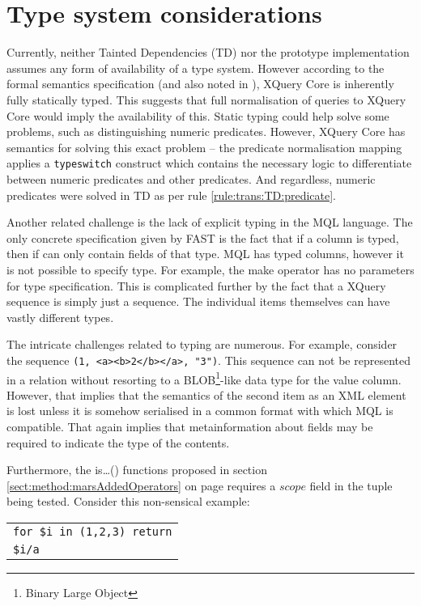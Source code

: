 \section{Type system considerations}
\label{sect:disc:typeSystem}
Currently, neither Tainted Dependencies (TD) nor the prototype
implementation assumes any form of availability of a type system. However
according to the formal semantics specification\cite{xquery_semantics} (and
also noted in \cite{pathfinder_compiling_xquery}), XQuery Core is inherently
fully statically typed. This suggests that full normalisation of queries to
XQuery Core would imply the availability of this. Static typing could help
solve some problems, such as distinguishing numeric predicates. However, XQuery
Core has semantics for solving this exact problem -- the predicate normalisation
mapping applies a \texttt{typeswitch} construct which contains the necessary logic to
differentiate between numeric predicates and other predicates. And regardless,
numeric predicates were solved in TD as per rule \ref{rule:trans:TD:predicate}.

Another related challenge is the lack of explicit typing in the MQL language.
The only concrete specification given by FAST is the fact that if a column is
typed, then if can only contain fields of that type. MQL has typed columns,
however it is not possible to specify type. For example, the \textsf{make}
operator has no parameters for type specification. This is complicated further
by the fact that a XQuery sequence is simply just a sequence. The individual
items themselves can have vastly different types.

The intricate challenges related to typing are numerous. For example, consider
the sequence \texttt{(1, <a><b>2</b></a>, "3")}. This sequence can not be
represented in a relation without resorting to a BLOB\footnote{Binary
Large Object}-like data type for the value column. However, that implies that
the semantics of the second item as an XML element is lost unless it is somehow
serialised in a common format with which MQL is compatible. That again implies
that metainformation about fields may be required to indicate the type of the
contents.

Furthermore, the \textsf{is\ldots{()}} functions proposed in section
\ref{sect:method:marsAddedOperators} on page
\pageref{sect:method:marsAddedOperators} requires a $scope$ field in the tuple
being tested. Consider this non-sensical example:

\begin{center}
\begin{tabular}{l}
\texttt{for \$i in (1,2,3) return} \\ \quad
\texttt{\$i/a}
\end{tabular}
\end{center}

